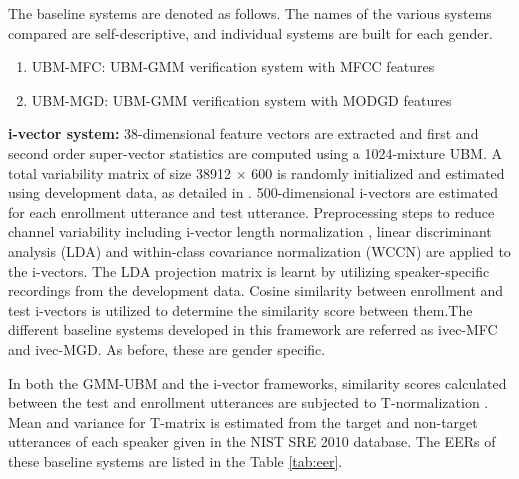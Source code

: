 \documentclass[preprint,12pt,5p]{elsarticle}
\begin{document}
The baseline systems are denoted as follows. The names of the various systems
compared are self-descriptive, and individual systems are built for each gender.
\begin{enumerate}
\item UBM-MFC: UBM-GMM verification system with MFCC features
\item UBM-MGD: UBM-GMM verification system with MODGD features
\end{enumerate}

\textbf{i-vector system:} 
38-dimensional feature vectors are extracted and first and second order
super-vector statistics are computed using a 1024-mixture UBM. A total
variability matrix of size 38912 $\times$ 600 is randomly initialized and
estimated using development data, as detailed in \cite{dehak_ivector,
kenny_JFA}.  500-dimensional i-vectors are estimated for each enrollment
utterance and test utterance. Preprocessing steps to reduce channel variability
including i-vector length normalization \cite{garciaRomero}, linear discriminant
analysis (LDA) and within-class covariance normalization (WCCN) are applied to
the i-vectors.  The LDA projection matrix is learnt by utilizing
speaker-specific recordings from the development data. %
Cosine similarity between enrollment and test i-vectors is utilized to determine
the similarity score between them.The different baseline systems developed in
this framework are referred as ivec-MFC and ivec-MGD. As before, these are
gender specific.

In both the GMM-UBM and the i-vector frameworks, similarity
scores calculated between the test and enrollment utterances 
are subjected to T-normalization \cite{tnorm}. Mean and variance for T-matrix is
estimated from the target and non-target utterances of each speaker given in the 
NIST SRE 2010 database.
The EERs of these baseline systems are listed in the Table \ref{tab:eer}.


\end{document}
